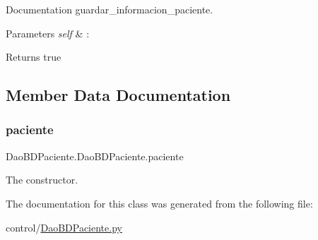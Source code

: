 Documentation guardar\+\_\+informacion\+\_\+paciente. 


\begin{DoxyParams}{Parameters}
{\em self} & \+: \\
\hline
\end{DoxyParams}
\begin{DoxyReturn}{Returns}
true 
\end{DoxyReturn}


\subsection{Member Data Documentation}
\mbox{\label{class_dao_b_d_paciente_1_1_dao_b_d_paciente_a427d394aacffefeb2e31027408a0fe41}} 
\subsubsection{\texorpdfstring{paciente}{paciente}}
{\footnotesize\ttfamily Dao\+B\+D\+Paciente.\+Dao\+B\+D\+Paciente.\+paciente}



The constructor. 



The documentation for this class was generated from the following file\+:\begin{DoxyCompactItemize}
\item 
control/\mbox{\hyperlink{_dao_b_d_paciente_8py}{Dao\+B\+D\+Paciente.\+py}}\end{DoxyCompactItemize}
